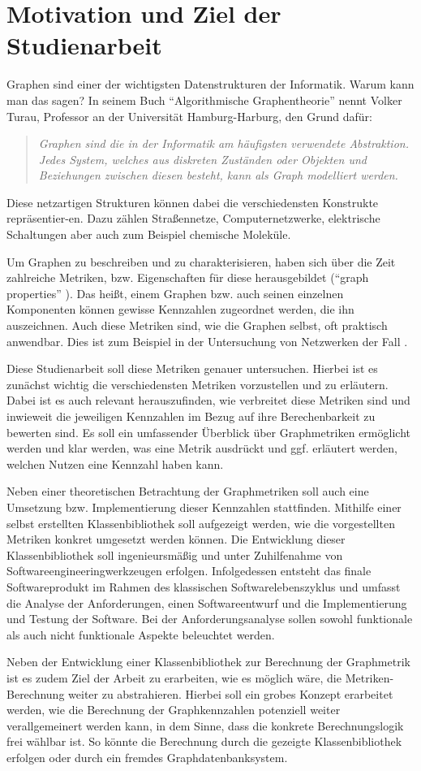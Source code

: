 \documentclass[a4paper,12pt,ngerman,chapterprefix=false,listof=totoc,bibliography=totoc]{scrreprt}
\newcommand{\zitat}[2]{
	\begin{quote}
		\textit{#1} \cite{#2}
	\end{quote}
}
\begin{document}
\section{Motivation und Ziel der Studienarbeit}{
Graphen sind einer der wichtigsten Datenstrukturen der Informatik. Warum kann man das sagen? In seinem Buch "`Algorithmische Graphentheorie"' nennt Volker Turau, Professor an der Universität Hamburg-Harburg, den Grund dafür:
\zitat{Graphen sind die in der Informatik am häufigsten verwendete Abstraktion. Jedes System, welches aus diskreten Zuständen oder Objekten und Beziehungen zwischen diesen besteht, kann als Graph modelliert werden.}{turau_algorithmische_2004}
Diese netzartigen Strukturen können dabei die verschiedensten Konstrukte repräsentier-en. Dazu zählen Straßennetze, Computernetzwerke, elektrische Schaltungen aber auch zum Beispiel chemische Moleküle. \cite{tittmann_graphentheorie_2019}

Um Graphen zu beschreiben und zu charakterisieren, haben sich über die Zeit zahlreiche Metriken, bzw. Eigenschaften für diese herausgebildet ("`graph properties"' \cite{lovasz_large_2012}). Das heißt, einem Graphen bzw. auch seinen einzelnen Komponenten können gewisse Kennzahlen zugeordnet werden, die ihn auszeichnen. Auch diese Metriken sind, wie die Graphen selbst, oft praktisch anwendbar. Dies ist zum Beispiel in der Untersuchung von Netzwerken der Fall \cite{ellens_graph_2013}.

Diese Studienarbeit soll diese Metriken genauer untersuchen. Hierbei ist es zunächst wichtig die verschiedensten Metriken vorzustellen und zu erläutern. Dabei ist es auch relevant herauszufinden, wie verbreitet diese Metriken sind und inwieweit die jeweiligen Kennzahlen im Bezug auf ihre Berechenbarkeit zu bewerten sind. Es soll ein umfassender Überblick über Graphmetriken ermöglicht werden und klar werden, was eine Metrik ausdrückt und ggf. erläutert werden, welchen Nutzen eine Kennzahl haben kann.

Neben einer theoretischen Betrachtung der Graphmetriken soll auch eine Umsetzung bzw. Implementierung dieser Kennzahlen stattfinden. Mithilfe einer selbst erstellten Klassenbibliothek soll aufgezeigt werden, wie die vorgestellten Metriken konkret umgesetzt werden können. Die Entwicklung dieser Klassenbibliothek soll ingenieursmäßig und unter Zuhilfenahme von Softwareengineeringwerkzeugen erfolgen. Infolgedessen entsteht das finale Softwareprodukt im Rahmen des klassischen Softwarelebenszyklus und umfasst die Analyse der Anforderungen, einen Softwareentwurf und die Implementierung und Testung der Software. Bei der Anforderungsanalyse sollen sowohl funktionale als auch nicht funktionale Aspekte beleuchtet werden. \cite{balzert_lehrbuch_2009,balzert_lehrbuch_2011}

Neben der Entwicklung einer Klassenbibliothek zur Berechnung der Graphmetrik ist es zudem Ziel der Arbeit zu erarbeiten, wie es möglich wäre, die Metriken-Berechnung weiter zu abstrahieren. Hierbei soll ein grobes Konzept erarbeitet werden, wie die Berechnung der Graphkennzahlen potenziell weiter verallgemeinert werden kann, in dem Sinne, dass die konkrete Berechnungslogik frei wählbar ist. So könnte die Berechnung durch die gezeigte Klassenbibliothek erfolgen oder durch ein fremdes Graphdatenbanksystem.
}
\end{document}
